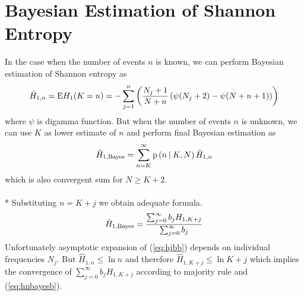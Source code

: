 \section {Bayesian Estimation of Shannon Entropy}
In the case when the number of events $n$ is known, we can perform Bayesian estimation of Shannon entropy as
\begin{equation} 
\label{eq:hjednan}
\hat{H}_{1,\scriptsize{n}} = \text{E}H_{1}(K=n) = -\sum_{j=1}^{n} \left( \frac{N_{j}+1}{N+n} \left( \psi(N_{j}+2) - \psi(N+n+1) \right) \right)
\end{equation}
where $\psi$ is digamma function. But when the number of events $n$ is unknown, we can use $K$ as lower estimate of $n$ and perform final Bayesian estimation as
\begin{equation} 
\label{eq:hjednab}
\hat{H}_{1,\mbox{\scriptsize{Bayes}}} = \sum_{n=K}^{\infty}{\text{p}\left(n \: \middle| \:K,N \right)\hat{H}_{1,\scriptsize{n}}}
\end{equation}
which is also convergent sum for $N \ge K+2$. \\
\\*
Substituting $n=K+j$ we obtain adequate formula.
\begin{equation} 
\label{eq:hjbb}
\hat{H}_{1,\mbox{\scriptsize{Bayes}}} = \frac{\sum_{j=0}^{\infty}b_{j}H_{1,K+j}}{\sum_{j=0}^{\infty}b_{j}}
\end{equation}
Unfortunately asymptotic expansion of (\ref{eq:hjbb}) depends on individual frequencies $N_{j}$. But $\hat{H}_{1,n} \leq \ln{n}$ and therefore $\hat{H}_{1,K+j} \leq \ln{K+j}$ which implies the convergence of $\sum_{j=0}^{\infty}b_{j}H_{1,K+j}$ according to majority rule and (\ref{eq:hnbayesb}).